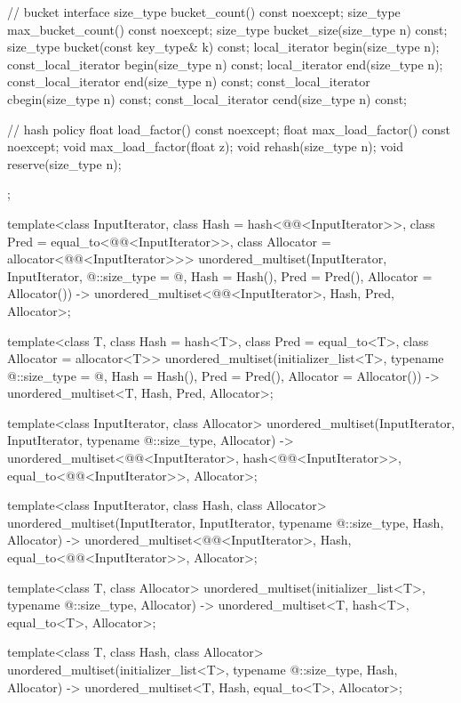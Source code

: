 \begin{codeblock}
{{    // bucket interface
    size_type bucket_count() const noexcept;
    size_type max_bucket_count() const noexcept;
    size_type bucket_size(size_type n) const;
    size_type bucket(const key_type& k) const;
    local_iterator begin(size_type n);
    const_local_iterator begin(size_type n) const;
    local_iterator end(size_type n);
    const_local_iterator end(size_type n) const;
    const_local_iterator cbegin(size_type n) const;
    const_local_iterator cend(size_type n) const;

    // hash policy
    float load_factor() const noexcept;
    float max_load_factor() const noexcept;
    void max_load_factor(float z);
    void rehash(size_type n);
    void reserve(size_type n);
  };

  template<class InputIterator,
           class Hash = hash<@@<InputIterator>>,
           class Pred = equal_to<@@<InputIterator>>,
           class Allocator = allocator<@@<InputIterator>>>
    unordered_multiset(InputIterator, InputIterator, @\seebelow@::size_type = @\seebelow@,
                       Hash = Hash(), Pred = Pred(), Allocator = Allocator())
      -> unordered_multiset<@@<InputIterator>,
                            Hash, Pred, Allocator>;

  template<class T, class Hash = hash<T>,
           class Pred = equal_to<T>, class Allocator = allocator<T>>
    unordered_multiset(initializer_list<T>, typename @\seebelow@::size_type = @\seebelow@,
                       Hash = Hash(), Pred = Pred(), Allocator = Allocator())
      -> unordered_multiset<T, Hash, Pred, Allocator>;

  template<class InputIterator, class Allocator>
    unordered_multiset(InputIterator, InputIterator, typename @\seebelow@::size_type, Allocator)
      -> unordered_multiset<@@<InputIterator>,
                            hash<@@<InputIterator>>,
                            equal_to<@@<InputIterator>>,
                            Allocator>;

  template<class InputIterator, class Hash, class Allocator>
    unordered_multiset(InputIterator, InputIterator, typename @\seebelow@::size_type,
                       Hash, Allocator)
      -> unordered_multiset<@@<InputIterator>, Hash,
                            equal_to<@@<InputIterator>>,
                            Allocator>;

  template<class T, class Allocator>
    unordered_multiset(initializer_list<T>, typename @\seebelow@::size_type, Allocator)
      -> unordered_multiset<T, hash<T>, equal_to<T>, Allocator>;

  template<class T, class Hash, class Allocator>
    unordered_multiset(initializer_list<T>, typename @\seebelow@::size_type, Hash, Allocator)
      -> unordered_multiset<T, Hash, equal_to<T>, Allocator>;
}
\end{codeblock}

